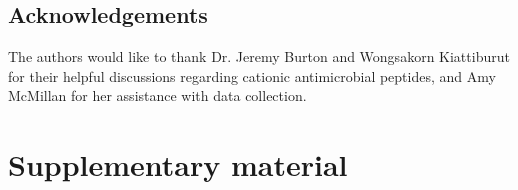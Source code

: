 \documentclass[sn-mathphys,Numbered]{sn-jnl}%
\begin{document}
\subsection{Acknowledgements}\label{subsec:subsecAcknowl}
The authors would like to thank Dr. Jeremy Burton and Wongsakorn Kiattiburut for their helpful discussions regarding cationic antimicrobial peptides, and Amy McMillan for her assistance with data collection.\newpage

\section{Supplementary material} \label{sec:secSupplFigs}

\setcounter{figure}{0}
\renewcommand{\figurename}{Supplementary Fig.}
\renewcommand{\thefigure}{S\arabic{figure}}
\renewcommand{\theHfigure}{S\arabic{figure}}

\setcounter{table}{0}
\renewcommand{\tablename}{Supplementary Table}
\renewcommand{\thetable}{S\arabic{table}}
\renewcommand{\theHtable}{S\arabic{table}}
\end{document}
